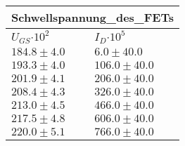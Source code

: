 \documentclass{article}
\begin{document}
\begin{tabular}{|p{3cm}|p{3cm}|}
\hline
\multicolumn{2}{|c|}{Schwellspannung_des_FETs}\\
\hline
$U_{GS}$$\cdot 10^{2}$&$I_D$$\cdot 10^{5}$\\
\hline
$184.8\pm4.0$&$6.0\pm 40.0$\\
$193.3\pm4.0$&$106.0\pm 40.0$\\
$201.9\pm4.1$&$206.0\pm 40.0$\\
$208.4\pm4.3$&$326.0\pm 40.0$\\
$213.0\pm4.5$&$466.0\pm 40.0$\\
$217.5\pm4.8$&$606.0\pm 40.0$\\
$220.0\pm5.1$&$766.0\pm 40.0$\\
\hline
\end{tabular}
\end{document}
